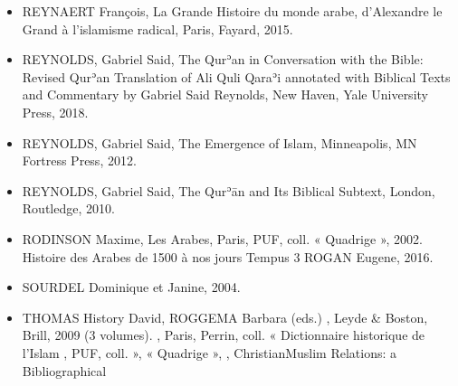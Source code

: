 \begin{itemize}
    \item REYNAERT François, La Grande Histoire du monde arabe, d'Alexandre le Grand à l'islamisme radical, Paris, Fayard, 2015.   \item REYNOLDS, Gabriel Said, The Qurʾan in Conversation with the Bible: Revised Qurʾan Translation of Ali Quli Qaraʾi annotated with Biblical Texts and Commentary by Gabriel Said Reynolds, New Haven, Yale University Press, 2018.   \item REYNOLDS, Gabriel Said, The Emergence of Islam, Minneapolis, MN Fortress Press, 2012.    \item REYNOLDS, Gabriel Said, The Qurʾān and Its Biblical Subtext, London, Routledge, 2010.   \item RODINSON Maxime, Les Arabes, Paris, PUF, coll. « Quadrige », 2002. Histoire des Arabes de 1500 à nos jours Tempus 3 ROGAN Eugene, 2016.   \item SOURDEL Dominique et Janine, 2004.   \item THOMAS History David, ROGGEMA Barbara (eds.) , Leyde & Boston, Brill, 2009 (3 volumes). , Paris, Perrin, coll. « Dictionnaire historique de l’Islam , PUF, coll. », « Quadrige », , ChristianMuslim Relations: a Bibliographical 
\end{itemize}